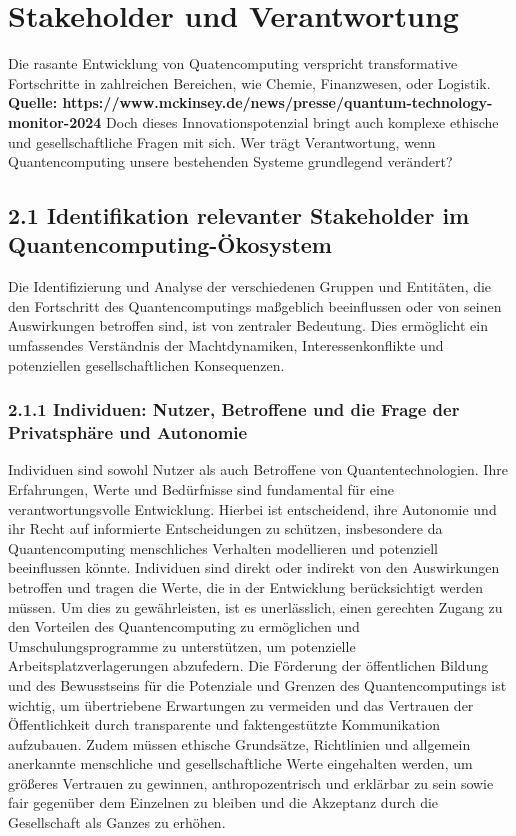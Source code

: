 \section{Stakeholder und Verantwortung}
Die rasante Entwicklung von Quatencomputing verspricht transformative Fortschritte in zahlreichen Bereichen, wie Chemie, Finanzwesen, oder Logistik.\textbf{ Quelle: https://www.mckinsey.de/news/presse/quantum-technology-monitor-2024}
Doch dieses Innovationspotenzial bringt auch komplexe ethische und gesellschaftliche Fragen mit sich. Wer trägt Verantwortung, wenn Quantencomputing unsere bestehenden Systeme grundlegend verändert?

\subsection{2.1 Identifikation relevanter Stakeholder im Quantencomputing-Ökosystem}
Die Identifizierung und Analyse der verschiedenen Gruppen und Entitäten, die den Fortschritt des Quantencomputings maßgeblich beeinflussen oder von seinen Auswirkungen betroffen sind, ist von zentraler Bedeutung. Dies ermöglicht ein umfassendes Verständnis der Machtdynamiken, Interessenkonflikte und potenziellen gesellschaftlichen Konsequenzen.

\subsubsection{2.1.1 Individuen: Nutzer, Betroffene und die Frage der Privatsphäre und Autonomie}

Individuen sind sowohl Nutzer als auch Betroffene von Quantentechnologien. Ihre Erfahrungen, Werte und Bedürfnisse sind fundamental für eine verantwortungsvolle Entwicklung. Hierbei ist entscheidend, ihre Autonomie und ihr Recht auf informierte Entscheidungen zu schützen, insbesondere da Quantencomputing menschliches Verhalten modellieren und potenziell beeinflussen könnte. Individuen sind direkt oder indirekt von den Auswirkungen betroffen und tragen die Werte, die in der Entwicklung berücksichtigt werden müssen. Um dies zu gewährleisten, ist es unerlässlich, einen gerechten Zugang zu den Vorteilen des Quantencomputing zu ermöglichen und Umschulungsprogramme zu unterstützen, um potenzielle Arbeitsplatzverlagerungen abzufedern. Die Förderung der öffentlichen Bildung und des Bewusstseins für die Potenziale und Grenzen des Quantencomputings ist wichtig, um übertriebene Erwartungen zu vermeiden und das Vertrauen der Öffentlichkeit durch transparente und faktengestützte Kommunikation aufzubauen. Zudem müssen ethische Grundsätze, Richtlinien und allgemein anerkannte menschliche und gesellschaftliche Werte eingehalten werden, um größeres Vertrauen zu gewinnen, anthropozentrisch und erklärbar zu sein sowie fair gegenüber dem Einzelnen zu bleiben und die Akzeptanz durch die Gesellschaft als Ganzes zu erhöhen.

